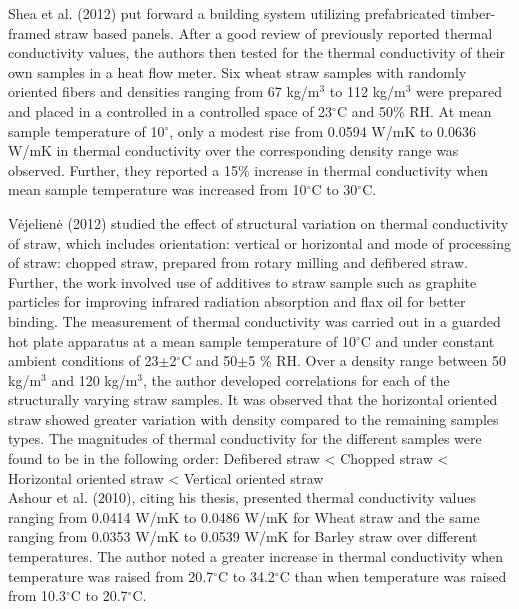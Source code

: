 \documentclass[]{article}
\begin{document}
Shea et al. (2012) put forward a building system utilizing prefabricated
timber-framed straw based panels. After a good review of previously
reported thermal conductivity values, the authors then tested for the
thermal conductivity of their own samples in a heat flow meter. Six
wheat straw samples with randomly oriented fibers and densities ranging
from 67 kg/m\(^{3}\) to 112 kg/m\(^{3}\) were prepared and placed in a
controlled in a controlled space of 23\(^{\circ}\)C and 50\% RH. At mean
sample temperature of 10\(^{\circ}\), only a modest rise from 0.0594
W/mK to 0.0636 W/mK in thermal conductivity over the corresponding
density range was observed. Further, they reported a 15\% increase in
thermal conductivity when mean sample temperature was increased from
10\(^{\circ}\)C to 30\(^{\circ}\)C.

 Vėjelienė (2012) studied the effect of structural variation on thermal
conductivity of straw, which includes orientation: vertical or
horizontal and mode of processing of straw: chopped straw, prepared from
rotary milling and defibered straw. Further, the work involved use of
additives to straw sample such as graphite particles for improving
infrared radiation absorption and flax oil for better binding. The
measurement of thermal conductivity was carried out in a guarded hot
plate apparatus at a mean sample temperature of 10\(^{\circ}\)C and
under constant ambient conditions of 23\(\pm\)2\(^{\circ}\)C and
50\(\pm\)5 \% RH. Over a density range between 50 kg/m\(^{3}\) and 120
kg/m\(^{3}\), the author developed correlations for each of the
structurally varying straw samples. It was observed that the horizontal
oriented straw showed greater variation with density compared to the
remaining samples types. The magnitudes of thermal conductivity for the
different samples were found to be in the following order: Defibered
straw \textless{} Chopped straw \textless{} Horizontal oriented straw
\textless{} Vertical oriented straw\\

 Ashour et al. (2010), citing his thesis, presented thermal conductivity
values ranging from 0.0414 W/mK to 0.0486 W/mK for Wheat straw and the
same ranging from 0.0353 W/mK to 0.0539 W/mK for Barley straw over
different temperatures. The author noted a greater increase in thermal
conductivity when temperature was raised from 20.7\(^{\circ}\)C to
34.2\(^{\circ}\)C than when temperature was raised from
10.3\(^{\circ}\)C to 20.7\(^{\circ}\)C.\\
\end{document}
